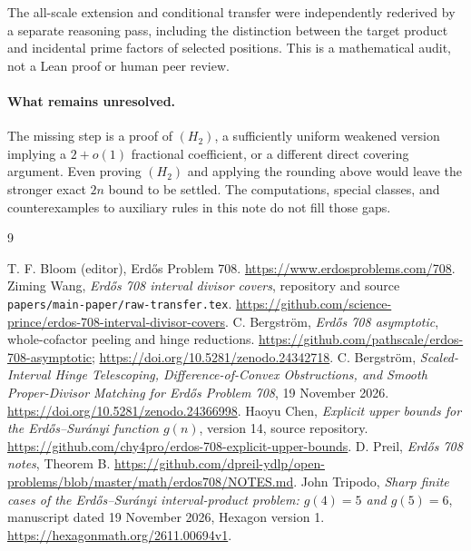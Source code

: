 \documentclass[11pt,a4paper]{article}
\theoremstyle{remark}
\begin{document}
The all-scale extension and conditional transfer were independently
rederived by a separate reasoning pass, including the distinction between
the target product and incidental prime factors of selected positions.
This is a mathematical audit, not a Lean proof or human peer review.

\paragraph{What remains unresolved.}
The missing step is a proof of $(H_2)$, a sufficiently uniform weakened
version implying a $2+o(1)$ fractional coefficient, or a different direct
covering argument. Even proving $(H_2)$ and applying the rounding above
would leave the stronger exact $2n$ bound to be settled. The computations,
special classes, and counterexamples to auxiliary rules in this note do
not fill those gaps.

\begin{thebibliography}{9}
\raggedright
{} T. F. Bloom (editor), Erd\H{o}s Problem 708.
\url{https://www.erdosproblems.com/708}.
 Ziming Wang, \emph{Erd\H{o}s 708 interval divisor covers},
repository and source \texttt{papers/main-paper/raw-transfer.tex}.
\url{https://github.com/science-prince/erdos-708-interval-divisor-covers}.
 C. Bergstr\"om, \emph{Erd\H{o}s 708 asymptotic},
whole-cofactor peeling and hinge reductions.
\url{https://github.com/pathscale/erdos-708-asymptotic};
\url{https://doi.org/10.5281/zenodo.24342718}.
 C. Bergstr\"om,
\emph{Scaled-Interval Hinge Telescoping, Difference-of-Convex Obstructions,
and Smooth Proper-Divisor Matching for Erd\H{o}s Problem 708},
19 November 2026. \url{https://doi.org/10.5281/zenodo.24366998}.
 Haoyu Chen,
\emph{Explicit upper bounds for the Erd\H{o}s--Sur\'anyi function $g(n)$},
version 14, source repository.
\url{https://github.com/chy4pro/erdos-708-explicit-upper-bounds}.
 D. Preil, \emph{Erd\H{o}s 708 notes}, Theorem B.
\url{https://github.com/dpreil-ydlp/open-problems/blob/master/math/erdos708/NOTES.md}.
 John Tripodo,
\emph{Sharp finite cases of the Erd\H{o}s--Sur\'anyi interval-product
problem: $g(4)=5$ and $g(5)=6$}, manuscript dated 19 November 2026,
Hexagon version 1. \url{https://hexagonmath.org/2611.00694v1}.
\end{thebibliography}
\end{document}

